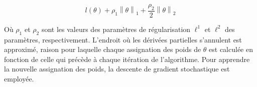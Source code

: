 \documentclass[PhD-Yoann-Dupont.tex]{subfiles}
\begin{document}
\begin{equation} \label{eq:penalised-log-likelihood}
l(\theta) + \rho_{1} \left \| \theta \right \|_{1} + \frac{\rho_{2}}{2} \left \| \theta \right \|_{2}
\end{equation}

Où $\rho_{1}$ et $\rho_{2}$ sont les valeurs des paramètres de régularisation $\ell^{1}$ et $\ell^{2}$ des paramètres, respectivement. L'endroit où les dérivées partielles s'annulent est approximé, raison pour laquelle chaque assignation des poids de $\theta$ est calculée en fonction de celle qui précède à chaque itération de l'algorithme. Pour apprendre la nouvelle assignation des poids, la descente de gradient stochastique \citep{Lafferty01} est employée.
\end{document}

